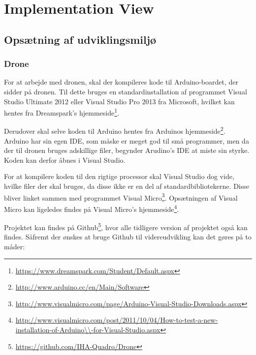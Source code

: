 \documentclass[Main]{subfiles}
\begin{document}
\section{Implementation View}


\subsection{Opsætning af udviklingsmiljø}

\subsubsection{Drone}\label{sec: Drone}
For at arbejde med dronen, skal der kompileres kode til Arduino-boardet, der sidder på dronen.
Til dette bruges en standardinstallation af programmet Visual Studio Ultimate 2012 eller Visual Studio Pro 2013 fra Microsoft, hvilket kan hentes fra Dreamspark's hjemmeside\footnote{\url{https://www.dreamspark.com/Student/Default.aspx}}.

Derudover skal selve koden til Arduino hentes fra Arduinos hjemmeside\footnote{\url{http://www.arduino.cc/en/Main/Software}}.
Arduino har sin egen IDE, som måske er meget god til små programmer, men da der til dronen bruges adskillige filer, begynder Arudino's IDE at miste sin styrke.
Koden kan derfor åbnes i Visual Studio.

For at kompilere koden til den rigtige processor skal Visual Studio dog vide, hvilke filer der skal bruges, da disse ikke er en del af standardbibliotekerne.
Disse bliver linket sammen med programmet Visual Micro\footnote{\url{http://www.visualmicro.com/page/Arduino-Visual-Studio-Downloads.aspx}}.
Opsætningen af Visual Micro kan ligeledes findes på Visual Micro's hjemmeside\footnote{\url{http://www.visualmicro.com/post/2011/10/04/How-to-test-a-new-installation-of-Arduino\\-for-Visual-Studio.aspx}}.

Projektet kan findes på Github\footnote{\url{https://github.com/IHA-Quadro/Drone}}, hvor alle tidligere version af projektet også kan findes.
Såfremt der ønskes at bruge Github til videreudvikling kan det gøres på to måder:
\end{document}

